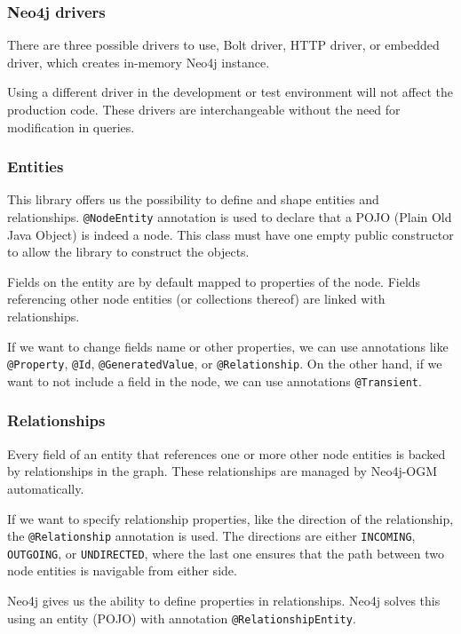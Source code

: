 \documentclass[thesis=M,english]{FITthesis}[2019/12/23]
\begin{document}
\subsubsection {Neo4j drivers}

There are three possible drivers to use, Bolt driver, HTTP driver, or embedded driver, which creates in-memory Neo4j instance.

Using a different driver in the development or test environment will not affect the production code. These drivers are interchangeable without the need for modification in queries.

\subsubsection {Entities}

This library offers us the possibility to define and shape entities and relationships. \texttt{@NodeEntity} annotation is used to declare that a POJO (Plain Old Java Object)
is indeed a node. This class must have one empty public constructor to allow the library to construct the objects.

Fields on the entity are by default mapped to properties of the node. Fields referencing other node entities (or collections thereof) are linked with relationships.

If we want to change fields name or other properties, we can use annotations like \texttt{@Property}, \texttt{@Id}, \texttt{@GeneratedValue}, or \texttt{@Relationship}. On the other hand,
if we want to not include a field in the node, we can use annotations \texttt{@Transient}.

\subsubsection {Relationships}

Every field of an entity that references one or more other node entities is backed by relationships in the graph. These relationships are managed by Neo4j-OGM automatically.

If we want to specify relationship properties, like the direction of the relationship, the \texttt{@Relationship} annotation is used. The directions are either \texttt{INCOMING},
\texttt{OUTGOING}, or \texttt{UNDIRECTED}, where the last one ensures that the path between two node entities is navigable from either side.

Neo4j gives us the ability to define properties in relationships. Neo4j solves this using an entity (POJO) with annotation \texttt{@RelationshipEntity}.
\end{document}
